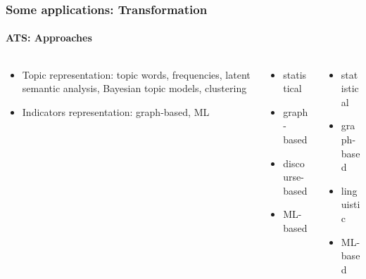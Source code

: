 \documentclass[xcolor=table]{beamer}
\begin{document}
\begin{frame}
	\frametitle{Some applications: Transformation}
	\framesubtitle{ATS: Approaches}
	\begin{columns}
		\begin{column}{0.4\textwidth}
			\begin{block}{\scriptsize\bfseries\cite{12-nenkova-mckeown}}
				\begin{itemize}
					\item Topic representation:
					topic words,
					frequencies,
					latent semantic analysis,
					Bayesian topic models,
					clustering

					\item Indicators representation: 
					graph-based, 
					ML
				\end{itemize}
			\end{block}
		\end{column}
		\begin{column}{0.3\textwidth}
			\begin{block}{\scriptsize\bfseries\cite{12-lloret-palomar}}
				\begin{itemize}
					\item statistical 
					\item graph-based
					\item discourse-based
					\item ML-based
				\end{itemize}
			\end{block}
		\end{column}
		\begin{column}{0.28\textwidth}
			\begin{block}{\scriptsize\bfseries\cite{19-aries-al}}
				\begin{itemize}
					\item statistical
					\item graph-based
					\item linguistic 
					\item ML-based
				\end{itemize}
			\end{block}
		\end{column}
	\end{columns}
\end{frame}
\end{document}
